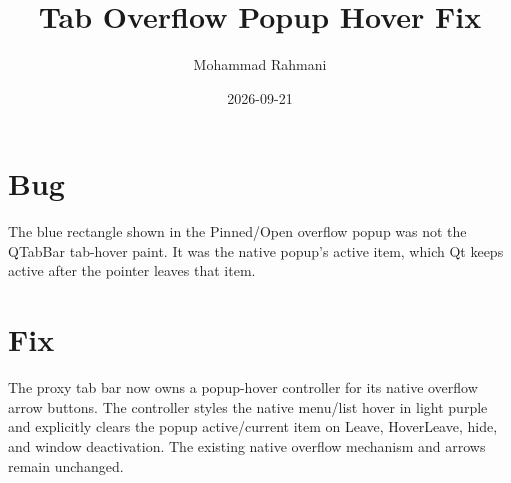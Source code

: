 \documentclass[a4paper]{article}
\title{Tab Overflow Popup Hover Fix}
\date{2026-09-21}
\author{Mohammad Rahmani}
\begin{document}
   \maketitle

   \begin{preview}
      \section{Bug}
      The blue rectangle shown in the Pinned/Open overflow popup was not the
      QTabBar tab-hover paint.  It was the native popup's active item, which
      Qt keeps active after the pointer leaves that item.

      \section{Fix}
      The proxy tab bar now owns a popup-hover controller for its native
      overflow arrow buttons.  The controller styles the native menu/list
      hover in light purple and explicitly clears the popup active/current
      item on Leave, HoverLeave, hide, and window deactivation.  The existing
      native overflow mechanism and arrows remain unchanged.
   \end{preview}

   
   
\end{document}
